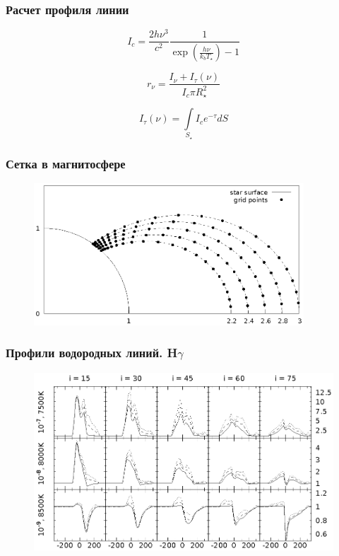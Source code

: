 \documentclass{beamer}
\begin{document}
\begin{frame}[noframenumbering]
\frametitle{Расчет профиля линии}
\begin{equation} \label{eq:profcont}
I_c = \frac{2h\nu^3}{c^2}\frac{1}{\exp\left(\frac{h\nu}{k_bT_\star}\right)-1} 
\end{equation}

\begin{equation} \label{eq:profnorm}
r_{\nu} = \frac{I_\nu + I_{\tau}(\nu)}{I_c \pi R_\star^2} 
\end{equation}

\begin{equation} \label{eq:absorbprof}
I_{\tau}(\nu) = \int \limits_{S_\star} I_c e^{-\tau} dS 
\end{equation}
\end{frame}

\begin{frame}[noframenumbering]
\frametitle{Сетка в магнитосфере}
\begin{figure}
\centering
\includegraphics[width=0.9\textwidth]{grid}
\end{figure}
\end{frame}

\begin{frame}[noframenumbering]
\frametitle{Профили водородных линий. H$\gamma$}
\begin{figure}[h]
\centering
\includegraphics[width=\textwidth]{hot_5_Hg.eps}
\end{figure}
\end{frame}
\end{document}
